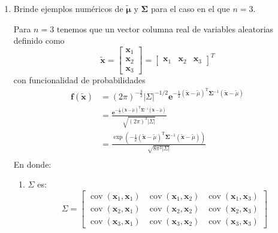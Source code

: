 \begin{problema}
\begin{enumerate}
\begin{sol}
\begin{enumerate}
        
        \end{enumerate}
    \end{sol}
    \item Brinde ejemplos numéricos de $\widetilde{\boldsymbol{\mu}}$ y $\boldsymbol{\Sigma}$ para el caso en el que $n=3$.
    \begin{sol}
        Para $n=3$ tenemos que un vector columna real de variables aleatorias definido como 
        $$\tilde{\boldsymbol{x}}=\begin{bmatrix}
            \boldsymbol{x}_1\\
            \boldsymbol{x}_2\\
            \boldsymbol{x}_3
        \end{bmatrix} = \begin{bmatrix}
            \boldsymbol{x}_1 & 
            \boldsymbol{x}_2 &
            \boldsymbol{x}_3
        \end{bmatrix}^T  $$
        con funcionalidad de probabilidades
        \begin{align*}
            \mathbf{f}(\tilde{\boldsymbol{x}}) &=(2 \pi)^{-\frac{\mathrm{3}}{2}}|\Sigma|^{-1/2} \mathbf{e}^{-\frac{1}{2}(\tilde{\boldsymbol{x}}-\tilde{\mu})^{\mathrm{T}} \boldsymbol{\Sigma}^{-1}(\tilde{\boldsymbol{x}}-\tilde{\mu})}\\
            &= \frac{\mathbf{e}^{-\frac{1}{2}(\tilde{\boldsymbol{x}}-\tilde{\mu})^{\mathrm{T}} \boldsymbol{\Sigma}^{-1}(\tilde{\boldsymbol{x}}-\tilde{\mu})}}{\sqrt{(2\pi)^3|\Sigma|}}\\
            &= \frac{\exp \left(-\frac{1}{2}(\tilde{\boldsymbol{x}}-\tilde{\mu})^{\mathrm{T}} \boldsymbol{\Sigma}^{-1}(\tilde{\boldsymbol{x}}-\tilde{\mu})\right)}{\sqrt{8\pi^3|\Sigma|}}\\
        \end{align*}
        En donde: 
        \begin{enumerate}
            \item $\Sigma$ es: 
            $$\Sigma =
            \begin{bmatrix}
                \operatorname{cov}(\boldsymbol{x}_1,\boldsymbol{x}_1) &  \operatorname{cov}(\boldsymbol{x}_1,\boldsymbol{x}_2) &  \operatorname{cov}(\boldsymbol{x}_1,\boldsymbol{x}_3)\\
                \operatorname{cov}(\boldsymbol{x}_2,\boldsymbol{x}_1) &  \operatorname{cov}(\boldsymbol{x}_2,\boldsymbol{x}_2) &  \operatorname{cov}(\boldsymbol{x}_2,\boldsymbol{x}_3)\\
                \operatorname{cov}(\boldsymbol{x}_3,\boldsymbol{x}_1) &  \operatorname{cov}(\boldsymbol{x}_3,\boldsymbol{x}_2) &  \operatorname{cov}(\boldsymbol{x}_3,\boldsymbol{x}_3)

\end{bmatrix}$$
\end{enumerate}
\end{sol}
\end{enumerate}
\end{problema}
